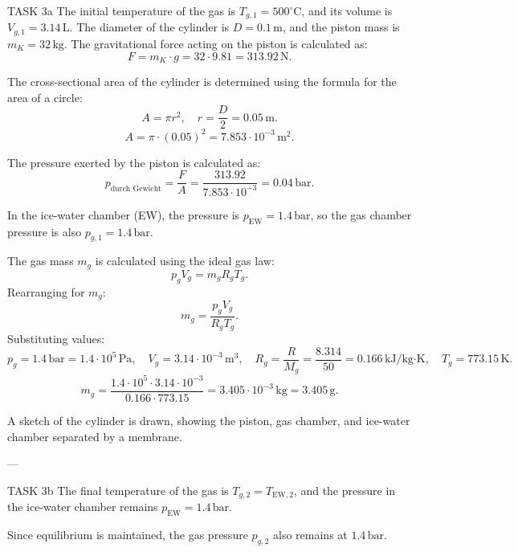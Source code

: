 TASK 3a  
The initial temperature of the gas is \( T_{g,1} = 500^\circ\text{C} \), and its volume is \( V_{g,1} = 3.14 \, \text{L} \). The diameter of the cylinder is \( D = 0.1 \, \text{m} \), and the piston mass is \( m_K = 32 \, \text{kg} \). The gravitational force acting on the piston is calculated as:  
\[
F = m_K \cdot g = 32 \cdot 9.81 = 313.92 \, \text{N}.
\]  

The cross-sectional area of the cylinder is determined using the formula for the area of a circle:  
\[
A = \pi r^2, \quad r = \frac{D}{2} = 0.05 \, \text{m}.
\]  
\[
A = \pi \cdot (0.05)^2 = 7.853 \cdot 10^{-3} \, \text{m}^2.
\]  

The pressure exerted by the piston is calculated as:  
\[
p_{\text{durch Gewicht}} = \frac{F}{A} = \frac{313.92}{7.853 \cdot 10^{-3}} = 0.04 \, \text{bar}.
\]  

In the ice-water chamber (EW), the pressure is \( p_{\text{EW}} = 1.4 \, \text{bar} \), so the gas chamber pressure is also \( p_{g,1} = 1.4 \, \text{bar} \).  

The gas mass \( m_g \) is calculated using the ideal gas law:  
\[
p_g V_g = m_g R_g T_g.
\]  
Rearranging for \( m_g \):  
\[
m_g = \frac{p_g V_g}{R_g T_g}.
\]  
Substituting values:  
\[
p_g = 1.4 \, \text{bar} = 1.4 \cdot 10^5 \, \text{Pa}, \quad V_g = 3.14 \cdot 10^{-3} \, \text{m}^3, \quad R_g = \frac{R}{M_g} = \frac{8.314}{50} = 0.166 \, \text{kJ/kg·K}, \quad T_g = 773.15 \, \text{K}.
\]  
\[
m_g = \frac{1.4 \cdot 10^5 \cdot 3.14 \cdot 10^{-3}}{0.166 \cdot 773.15} = 3.405 \cdot 10^{-3} \, \text{kg} = 3.405 \, \text{g}.
\]  

A sketch of the cylinder is drawn, showing the piston, gas chamber, and ice-water chamber separated by a membrane.  

---

TASK 3b  
The final temperature of the gas is \( T_{g,2} = T_{\text{EW},2} \), and the pressure in the ice-water chamber remains \( p_{\text{EW}} = 1.4 \, \text{bar} \).  

Since equilibrium is maintained, the gas pressure \( p_{g,2} \) also remains at \( 1.4 \, \text{bar} \).  

